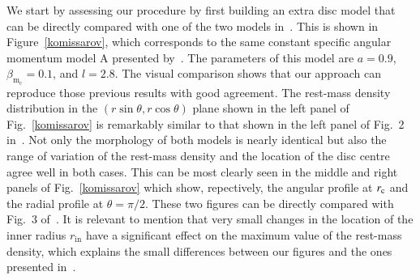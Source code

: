 \documentclass{aa}
\begin{document}
We start by assessing our procedure by first building an extra disc model that can be directly compared with one of the two models in~\citet{Komissarov:2006}. This is shown in Figure~\ref{komissarov}, which corresponds to the same constant specific angular momentum model A presented by~\citet{Komissarov:2006}. The parameters of this model are $a=0.9$, $\beta_{\mathrm{m}_{\mathrm{c}}}=0.1$, and $l=2.8$.
The visual comparison shows that our approach can reproduce those previous results with good agreement. The rest-mass density distribution in the $(r\sin\theta,r\cos\theta)$ plane shown in the left panel of Fig.~\ref{komissarov} is remarkably similar to that shown in the left panel of Fig.~2 in~\citet{Komissarov:2006}. Not only the morphology of both models is nearly identical but also the range of variation of the rest-mass density and the location of the disc centre agree well in both cases. This can be most clearly seen in the middle and right panels of Fig.~\ref{komissarov} which show, repectively, the angular profile at $r_{\rm c}$ and the radial profile at $\theta=\pi/2$. These two figures can be directly compared with Fig.~3 of~\citet{Komissarov:2006}. It is relevant to mention that very small changes in the location of the inner radius $r_{\mathrm{in}}$ have a significant effect on the maximum value of the rest-mass density, which explains the small differences between our figures and the ones presented in~\citet{Komissarov:2006}.
\end{document}
